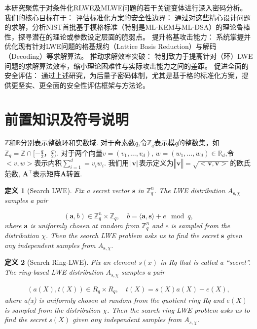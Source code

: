 \documentclass[12pt,a4paper]{article}
\newtheorem{definition}{定义} %
\numberwithin{equation}{section}
\begin{document}
本研究聚焦于对条件化RLWE及MLWE问题的若干关键变体进行深入密码分析。 我们的核心目标在于：
评估标准化方案的安全性边界： 通过对这些精心设计问题的求解，分析NIST首批基于模格标准（特别是ML-KEM与ML-DSA）的理论鲁棒性，探寻潜在的理论或参数设定层面的脆弱点。
提升格基攻击能力： 系统掌握并优化现有针对LWE问题的格基规约（Lattice Basis Reduction）与解码（Decoding）等求解算法。
推动求解效率突破： 特别致力于提高针对（环）LWE问题的求解算法效率，缩小理论困难性与实际攻击能力之间的差距。
促进全面的安全评估： 通过上述研究，为后量子密码体制，尤其是基于格的标准化方案，提供更坚实、更全面的安全性评估框架与方法论。





\section{前置知识及符号说明}
$\mathbb{Z}$和$\mathbb{R}$分别表示整数环和实数域.
对于奇素数$q$,令$\mathbb{Z}_q$表示模$q$的整数集，如$\mathbb{Z}_q = \mathbb{Z}\cap[-\frac{q}{2}，\frac{q}{2})$.
对于两个向量$v =(v_1 , \ldots , v_d)$, $w = ( w_1 , \ldots , w_d) \in \mathbb{R}_d$,令$<v,w>$表示内积$ \sum_{i=1}^{d}= v_iw_i$.
我们用$‖\mathbf{v}‖$表示定义为$‖\mathbf{v}‖=\sqrt{<\mathbf{v},\mathbf{v}>}$的欧氏范数, $\mathbf{A}^\top$表示矩阵$\mathbf{A}$转置.

\begin{definition}[Search LWE]
Fix a secret vector $\mathbf{s}$ in $\mathbb{Z}_q^n$.  
The LWE distribution $A_{\mathbf{s},\chi}$ samples a pair  

\[
(\mathbf{a}, b) \in \mathbb{Z}_q^n \times \mathbb{Z}_q, \quad b = \langle \mathbf{a}, \mathbf{s} \rangle + e \mod q,
\]  
where $\mathbf{a}$ is uniformly chosen at random from $\mathbb{Z}_q^n$ and $e$ is sampled from the distribution $\chi$. Then the search LWE problem asks us to find the secret $\mathbf{s}$ given any independent samples from $A_{\mathbf{s},\chi}$.  
\end{definition}

\begin{definition}[Search Ring-LWE]
Fix an element $s(x)$ in Rq that is called a “secret”. 
The ring-based LWE distribution $A_{s,\chi}$ samples a pair

\begin{align*}
    (a(X), t(X)) \in R_q \times R_q, \quad t(X) = s(X)a(X) + e(X),
\end{align*}
where a(x) is uniformly chosen at random from the quotient ring Rq and $e(X)$ is sampled from the distribution $\chi$. Then the search ring-LWE problem asks us to find the secret $s(X)$ given any independent samples from $A_{s,\chi}$.
\end{definition}
\end{document}
